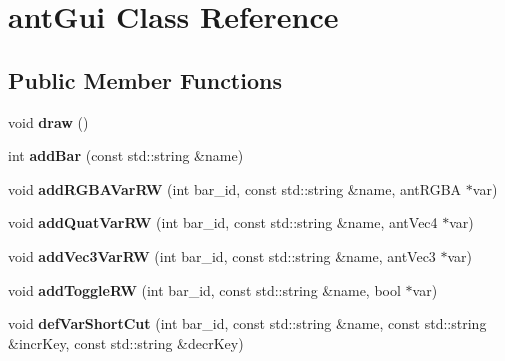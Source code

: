 \hypertarget{classant_gui}{\section{ant\+Gui Class Reference}
\label{classant_gui}
}
\subsection*{Public Member Functions}
\begin{DoxyCompactItemize}
\item 
\hypertarget{classant_gui_af5ac8a7bc1dba022721abb5bf0abacf4}{void {\bfseries draw} ()}\label{classant_gui_af5ac8a7bc1dba022721abb5bf0abacf4}

\item 
\hypertarget{classant_gui_a9adcce1fff8441b8df983579e20eba70}{int {\bfseries add\+Bar} (const std\+::string \&name)}\label{classant_gui_a9adcce1fff8441b8df983579e20eba70}

\item 
\hypertarget{classant_gui_a8d04951cf76d44d6f7bc93daac2ac760}{void {\bfseries add\+R\+G\+B\+A\+Var\+R\+W} (int bar\+\_\+id, const std\+::string \&name, ant\+R\+G\+B\+A $\ast$var)}\label{classant_gui_a8d04951cf76d44d6f7bc93daac2ac760}

\item 
\hypertarget{classant_gui_a9da1d56f2ddff3f65ed49161d8a20605}{void {\bfseries add\+Quat\+Var\+R\+W} (int bar\+\_\+id, const std\+::string \&name, ant\+Vec4 $\ast$var)}\label{classant_gui_a9da1d56f2ddff3f65ed49161d8a20605}

\item 
\hypertarget{classant_gui_af60ea51ab6b08de2e19f23703211409f}{void {\bfseries add\+Vec3\+Var\+R\+W} (int bar\+\_\+id, const std\+::string \&name, ant\+Vec3 $\ast$var)}\label{classant_gui_af60ea51ab6b08de2e19f23703211409f}

\item 
\hypertarget{classant_gui_a83e8eb1ff5c1c2f93e1a1fb3e3cbba6e}{void {\bfseries add\+Toggle\+R\+W} (int bar\+\_\+id, const std\+::string \&name, bool $\ast$var)}\label{classant_gui_a83e8eb1ff5c1c2f93e1a1fb3e3cbba6e}

\item 
\hypertarget{classant_gui_aa2b6c03e320d06935f88eb3ba72a9a29}{void {\bfseries def\+Var\+Short\+Cut} (int bar\+\_\+id, const std\+::string \&name, const std\+::string \&incr\+Key, const std\+::string \&decr\+Key)}\label{classant_gui_aa2b6c03e320d06935f88eb3ba72a9a29}

\end{DoxyCompactItemize}
